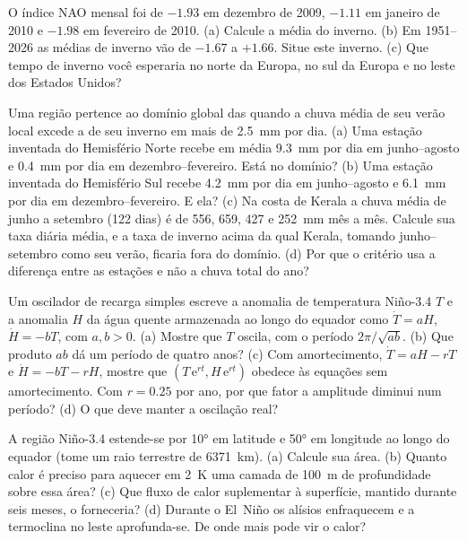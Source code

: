 \begin{exercise}[$\star\star$]\label{exo:b2:climate-variability:8}
O índice NAO mensal foi de $-1.93$ em dezembro de 2009, $-1.11$ em janeiro de 2010 e $-1.98$ em
fevereiro de 2010. (a) Calcule a média do inverno. (b) Em 1951--2026 as médias de inverno vão de
$-1.67$ a $+1.66$. Situe este inverno. (c) Que tempo de inverno você esperaria no norte da
Europa, no sul da Europa e no leste dos Estados Unidos?
\end{exercise}

\begin{exercise}[$\star\star$]\label{exo:b2:climate-variability:9}
Uma região pertence ao domínio global das  quando a chuva média de seu verão local excede a
de seu inverno em mais de \qty{2.5}{mm} por dia. (a) Uma estação inventada do Hemisfério
Norte recebe em média \qty{9.3}{mm} por dia em junho--agosto e \qty{0.4}{mm} por dia em
dezembro--fevereiro. Está no domínio? (b) Uma estação inventada do Hemisfério Sul
recebe \qty{4.2}{mm} por dia em junho--agosto e \qty{6.1}{mm} por dia em dezembro--fevereiro. E
ela? (c) Na costa de Kerala a chuva média de junho a setembro (122 dias) é de 556, 659, 427 e
\qty{252}{mm} mês a mês. Calcule sua taxa diária média, e a taxa de inverno acima da qual Kerala,
tomando junho--setembro como seu verão, ficaria fora do domínio. (d) Por que o critério
usa a diferença entre as estações e não a chuva total do ano?
\end{exercise}

\begin{exercise}[$\star\star\star$]\label{exo:b2:climate-variability:10}
Um oscilador de recarga simples escreve a anomalia de temperatura Niño-3.4 $T$ e a anomalia $H$ da
água quente armazenada ao longo do equador como $\dot T = aH$, $\dot H = -bT$, com $a, b > 0$. (a) Mostre
que $T$ oscila, com o período $2\pi/\sqrt{ab}$. (b) Que produto $ab$ dá um período de
quatro anos? (c) Com amortecimento, $\dot T = aH - rT$ e $\dot H = -bT - rH$, mostre que
$(T\,\mathrm{e}^{rt}, H\,\mathrm{e}^{rt})$ obedece às equações sem amortecimento. Com $r = 0.25$ por
ano, por que fator a amplitude diminui num período? (d) O que deve manter a
oscilação real?
\end{exercise}

\begin{exercise}[$\star\star\star$]\label{exo:b2:climate-variability:11}
A região Niño-3.4 estende-se por \ang{10} em latitude e \ang{50} em longitude ao longo do equador
(tome um raio terrestre de \qty{6371}{km}). (a) Calcule sua área. (b) Quanto calor é preciso para
aquecer em \qty{2}{K} uma camada de \qty{100}{m} de profundidade sobre essa área? (c) Que fluxo de calor suplementar à superfície,
mantido durante seis meses, o forneceria? (d) Durante o El~Niño os alísios enfraquecem e a
termoclina no leste aprofunda-se. De onde mais pode vir o calor?
\end{exercise}


